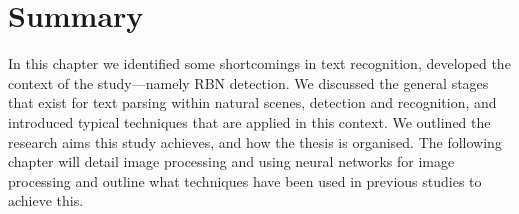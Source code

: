 




\section*{Summary}

In this chapter we identified some shortcomings in text recognition, developed the context of the study---namely RBN detection. We discussed the general stages that exist for text parsing within natural scenes, detection and recognition, and introduced typical techniques that are applied in this context. We outlined the research aims this study achieves, and how the thesis is organised. The following chapter will detail  image processing and using neural networks for image processing and outline what techniques have been used in previous studies to achieve this.